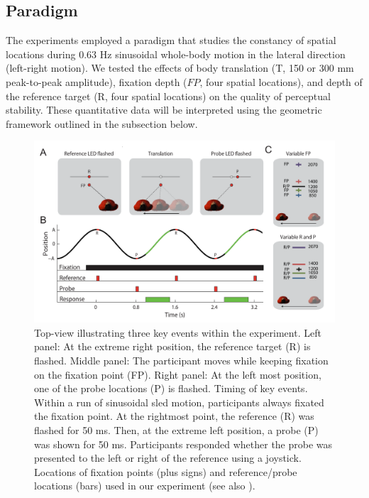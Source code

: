 \subsection{Paradigm}

The experiments employed a paradigm that studies the constancy of spatial locations during 0.63 \si{\hertz} sinusoidal whole-body motion in the lateral direction (left-right motion). We tested the effects of body translation (T, 150 or 300 \si{\milli\metre} peak-to-peak amplitude), fixation depth ($FP$, four spatial locations), and depth of the reference target (R, four spatial locations) on the quality of perceptual stability. These quantitative data will be interpreted using the geometric framework outlined in the subsection  below.

\begin{figure}
	\includegraphics[width=1.0\textwidth]{src/paper2/figure1.pdf}
	
	\caption{ Top-view illustrating three key events within the experiment. Left panel: At the extreme right position, the reference target (R) is flashed. Middle panel: The participant moves while keeping fixation on the fixation point (FP). Right panel: At the left most position, one of the probe locations (P) is flashed.  Timing of key events. Within a run of sinusoidal sled motion, participants always fixated the fixation point. At the rightmost point, the reference (R) was flashed for 50 \si{\milli\second}. Then, at the extreme left position, a probe (P) was shown for 50 \si{\milli\second}. Participants responded whether the probe was presented to the left or right of the reference using a joystick.  Locations of fixation points (plus signs) and reference/probe locations (bars) used in our experiment (see also ).}
	
	\label{p2:fig1}
\end{figure}

